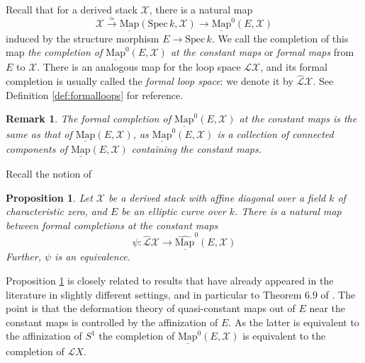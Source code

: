 \documentclass[11pt,letterpaper]{amsart}
\newtheorem{proposition}[dummy]{Proposition}
\newtheorem{remark}[dummy]{Remark}
\newcommand{\cL}{\mathcal{L}}
\newcommand{\cX}{\mathcal{X}}
\newcommand{\Map}[2]{\underline{\mathrm{Map}}\left (#1,#2\right )}
\newcommand{\Mapo}[2]{\underline{\mathrm{Map}}^{0}\left (#1,#2\right )}
\newcommand{\fMapo}[2]{\underline{\widehat{\mathrm{Map}}}^{0}\left (#1,#2\right )}
\newcommand{\Spec}{\mathrm{S}\mathrm{pec}\,}
\begin{document}
Recall that for a derived stack $\mathcal{X}$, there is a natural map
\begin{equation*}
\mathcal{X}\xrightarrow{\simeq}\Map{\Spec k}{\mathcal{X}}\rightarrow\Mapo{E}{\mathcal{X}}
\end{equation*}
induced by the structure morphism $E\rightarrow \Spec k$. We call the completion of this map \emph{the completion of $\Mapo{E}{\cX}$ at the constant maps} or \emph{formal maps} from $E$ to $\cX$. There is an analogous map for the loop space $\cL\cX$, and its formal completion is usually called the \emph{formal loop space}: we denote it by $\widehat{\cL}\cX$. See Definition \ref{def:formalloops} for reference.
\begin{remark}
The formal completion of $\Mapo{E}{\cX}$ at the constant maps is the same as that of $\Map{E}{\cX}$, as $\Mapo{E}{\cX}$ is  a collection of connected components of $\Map{E}{\cX}$ containing  the constant maps.
\end{remark}
Recall the notion of 
\begin{proposition}\label{proposition:formalcompletions}
Let $\cX$ be a derived stack with affine diagonal over a field $k$ of characteristic zero, and $E$ be an elliptic curve over $k$. There is a natural map between formal completions at the constant maps
\begin{equation*}
\psi:\widehat{\cL}\cX\rightarrow\fMapo{E}{\cX}
\end{equation*}
Further, $\psi$ is an equivalence. 
\end{proposition}
Proposition \ref{proposition:formalcompletions} is closely related to results that have already appeared in the literature in slightly different settings, and in particular to Theorem 6.9 of \cite{BZNLoopConn}. The point is that the deformation theory of quasi-constant maps out of $E$ near the constant maps is controlled by the affinization of $E$. As the latter is equivalent to the affinization of $S^1$ the completion of $\Mapo{E}{\cX}$ is equivalent to the completion of $\cL X$. 
\end{document}
